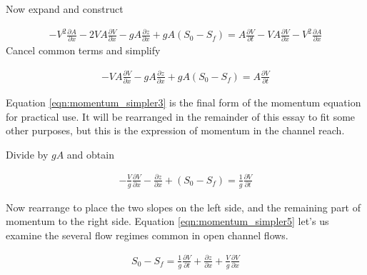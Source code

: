 Now expand and construct


\begin{equation}
\begin{split}
-V^2\frac{\partial A}{\partial x} - 2VA \frac{\partial V}{\partial x}
- gA \frac{\partial z}{\partial x} + gA(S_0-S_f)   = A \frac{\partial V }{\partial t} -VA \frac{ \partial V }{\partial x} - V^2 \frac{\partial A }{\partial x} 
\end{split}
\label{eqn:momentum_simpler2}
\end{equation}
Cancel common terms and simplify

\begin{equation}
\begin{split}
-VA \frac{\partial V}{\partial x}
- gA \frac{\partial z}{\partial x} + gA(S_0-S_f)   = A \frac{\partial V }{\partial t} 
\end{split}
\label{eqn:momentum_simpler3}
\end{equation}

Equation \ref{eqn:momentum_simpler3} is the final form of the momentum equation for practical use.  It will be rearranged in the remainder of this essay to fit some other purposes, but this is the expression of momentum in the channel reach.

Divide by $gA$ and obtain 

\begin{equation}
\begin{split}
- \frac{V}{g}\frac{\partial V}{\partial x}
-  \frac{\partial z}{\partial x} + (S_0-S_f)   =  \frac{1}{g}\frac{\partial V }{\partial t} 
\end{split}
\label{eqn:momentum_simpler4}
\end{equation}

Now rearrange to place the two slopes on the left side, and the remaining part of momentum to the right side.  
Equation \ref{eqn:momentum_simpler5} let's us examine the several flow regimes common in open channel flows.

\begin{equation}
\begin{split}
S_0-S_f   =  \frac{1}{g}\frac{\partial V }{\partial t}   +  \frac{\partial z}{\partial x} + \frac{V}{g}\frac{\partial V}{\partial x}
\end{split}
\label{eqn:momentum_simpler5}
\end{equation}

